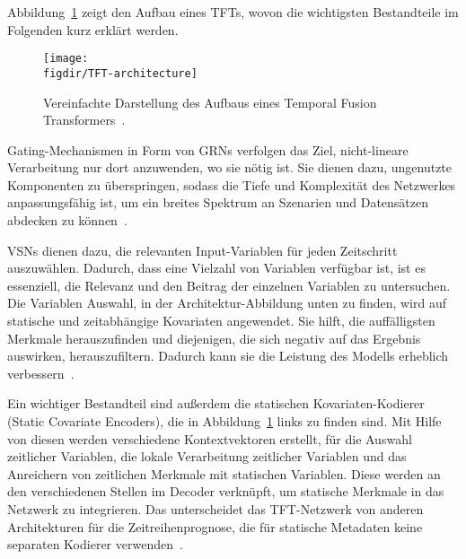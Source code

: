 Abbildung~\ref{FIG:tft-architecture} zeigt den Aufbau eines \acp{TFT}, wovon die wichtigsten Bestandteile im Folgenden kurz erklärt werden.
\begin{figure}
 \caption[Aufbau eines Temporal Fusion Transformers]{Vereinfachte Darstellung des Aufbaus eines Temporal Fusion Transformers~\cite{Labiadh.2023}.}
 {\texttt{[image: \\figdir/TFT-architecture]}}
 \label{FIG:tft-architecture}
\end{figure}

Gating-Mechanismen in Form von \acp{GRN} verfolgen das Ziel, nicht-lineare Verarbeitung nur dort anzuwenden, wo sie nötig ist.
Sie dienen dazu, ungenutzte Komponenten zu überspringen, sodass die Tiefe und Komplexität des Netzwerkes anpassungsfähig ist, um ein breites Spektrum an Szenarien und Datensätzen abdecken zu können~\cite{Lim.19.12.2019}.

\acp{VSN} dienen dazu, die relevanten Input-Variablen für jeden Zeitschritt auszuwählen.
Dadurch, dass eine Vielzahl von Variablen verfügbar ist, ist es essenziell, die Relevanz und den Beitrag der einzelnen Variablen zu untersuchen.
Die Variablen Auswahl, in der Architektur-Abbildung unten zu finden, wird auf statische und zeitabhängige Kovariaten angewendet.
Sie hilft, die auffälligsten Merkmale herauszufinden und diejenigen, die sich negativ auf das Ergebnis auswirken, herauszufiltern.
Dadurch kann sie die Leistung des Modells erheblich verbessern~\cite{Lim.19.12.2019}.

Ein wichtiger Bestandteil sind außerdem die statischen Kovariaten-Kodierer (Static Covariate Encoders), die in Abbildung~\ref{FIG:tft-architecture} links zu finden sind.
Mit Hilfe von diesen werden verschiedene Kontextvektoren erstellt, für die Auswahl zeitlicher Variablen, die lokale Verarbeitung zeitlicher Variablen und das Anreichern von zeitlichen Merkmale mit statischen Variablen.
Diese werden an den verschiedenen Stellen im Decoder verknüpft, um statische Merkmale in das Netzwerk zu integrieren.
Das unterscheidet das \ac{TFT}-Netzwerk von anderen Architekturen für die Zeitreihenprognose, die für statische Metadaten keine separaten Kodierer verwenden~\cite{Lim.19.12.2019, Labiadh.2023}.

